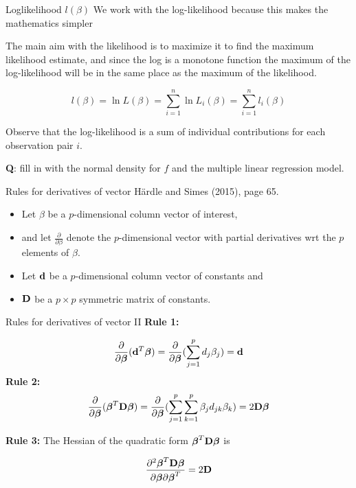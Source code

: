 \documentclass[
  ignorenonframetext,
]{beamer}
\providecommand{\tightlist}{%
  \setlength{\itemsep}{0pt}\setlength{\parskip}{0pt}}
\begin{document}
\begin{frame}
\begin{block}{Loglikelihood \(l(\beta)\)}
\protect{}\label{loglikelihood-lbeta}
We work with the log-likelihood because this makes the mathematics
simpler

The main aim with the likelihood is to maximize it to find the maximum
likelihood estimate, and since the log is a monotone function the
maximum of the log-likelihood will be in the same place as the maximum
of the likelihood.

\[
l(\beta)=\ln L(\beta)=\sum_{i=1}^n \ln L_i(\beta)=\sum_{i=1}^n l_i(\beta)
\]

Observe that the log-likelihood is a sum of individual contributions for
each observation pair \(i\).

\textbf{Q}: fill in with the normal density for \(f\) and the multiple
linear regression model.
\end{block}
\end{frame}

\begin{frame}
\begin{block}{Rules for derivatives of vector}
\protect{}\label{rules-for-derivatives-of-vector}
Härdle and Simes (2015), page 65.

\begin{itemize}
\tightlist
\item
  Let \({\beta}\) be a \(p\)-dimensional column vector of interest,
\item
  and let \(\frac{\partial}{\partial {\beta}}\) denote the
  \(p\)-dimensional vector with partial derivatives wrt the \(p\)
  elements of \({\beta}\).
\item
  Let \({\bf d}\) be a \(p\)-dimensional column vector of constants and
\item
  \({\bf D}\) be a \(p\times p\) symmetric matrix of constants.
\end{itemize}
\end{block}
\end{frame}

\begin{frame}
\begin{block}{Rules for derivatives of vector II}
\protect{}\label{rules-for-derivatives-of-vector-ii}
\textbf{Rule 1:}

\[\frac{\partial}{\partial \boldsymbol{\beta}}({\bf d}^T\boldsymbol{\beta})=\frac{\partial}{\partial \boldsymbol{\beta}}(\sum_{j=1}^p d_j \beta_j)={\bf d}\]
\textbf{Rule 2:}
\[\frac{\partial}{\partial \boldsymbol{\beta}}(\boldsymbol{\beta}^T{\bf D}\boldsymbol{\beta})=\frac{\partial}{\partial \boldsymbol{\beta}}(\sum_{j=1}^p \sum_{k=1}^p \beta_j d_{jk} \beta_k)=2{\bf D}\boldsymbol{\beta}\]

\textbf{Rule 3:} The Hessian of the quadratic form
\(\boldsymbol{\beta}^T{\bf D}\boldsymbol{\beta}\) is

\[\frac{\partial^2 \boldsymbol{\beta}^T{\bf D}\boldsymbol{\beta}}{\partial \boldsymbol{\beta}\partial \boldsymbol{\beta}^T}= 2{\bf D}\]
\end{block}
\end{frame}
\end{document}
